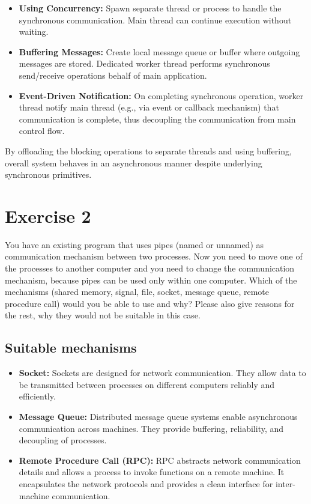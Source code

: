 \documentclass{article}
\newcommand{\exercise}[1]{
    \section*{Exercise #1}
    \markboth{Exercise #1}{}
}
\begin{document}
\begin{enumerate}[label=\textbf{\makebox[1cm][l]{\Huge\text{(\stylishfont\alph*)}}}, leftmargin=!, labelindent=0pt]
  \begin{itemize}
    \item \textbf{Using Concurrency:} Spawn separate thread or process
    to handle the synchronous communication. Main thread can continue
    execution without waiting.
    \item \textbf{Buffering Messages:} Create local message queue or
    buffer where outgoing messages are stored. Dedicated worker thread
    performs synchronous send/receive operations behalf of main
    application.
    \item \textbf{Event-Driven Notification:} On completing synchronous
    operation, worker thread notify main thread (e.g., via 
    event or callback mechanism) that communication is complete,
    thus decoupling the communication from main control flow.
  \end{itemize}

By offloading the blocking operations to separate threads and using
buffering, overall system behaves in an asynchronous manner despite
underlying synchronous primitives.

\end{enumerate}



\newpage

\exercise{2}
You have an existing program that uses pipes (named or unnamed) as communication mechanism
between two processes. Now you need to move one of the processes to another computer and
you need to change the communication mechanism, because pipes can be used only within one
computer. Which of the mechanisms (shared memory, signal, file, socket, message queue, remote
procedure call) would you be able to use and why? Please also give reasons for the rest, why
they would not be suitable in this case.

\subsection*{Suitable mechanisms}
\begin{itemize}
    \item \textbf{Socket:} Sockets are designed for network communication.
    They allow data to be transmitted between processes on
    different computers reliably and efficiently.
    \item \textbf{Message Queue:} Distributed message queue systems
    enable asynchronous communication across machines. They provide
    buffering, reliability, and decoupling of processes.
    \item \textbf{Remote Procedure Call (RPC):} RPC abstracts network
    communication details and allows a process to invoke functions
    on a remote machine. It encapsulates the network protocols and
    provides a clean interface for inter-machine communication.
\end{itemize}
\end{document}
